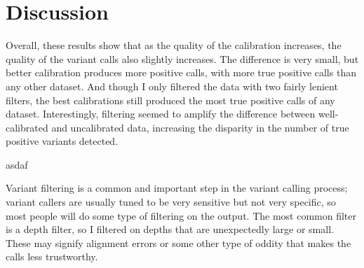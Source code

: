 \documentclass{report}
\begin{document}

\section{Discussion}
\begin{outline}
\item Overall, these results show that as the quality of the calibration increases, the quality of the variant calls also slightly increases. The difference is very small, but better calibration produces more positive calls, with more true positive calls than any other dataset. And though I only filtered the data with two fairly lenient filters, the best calibrations still produced the most true positive calls of any dataset. Interestingly, filtering seemed to amplify the difference between well-calibrated and uncalibrated data, increasing the disparity in the number of true positive variants detected.

\item asdaf


\item Variant filtering is a common and important step in the variant calling process; variant callers are usually tuned to be very sensitive but not very specific, so most people will do some type of filtering on the output. The most common filter is a depth filter, so I filtered on depths that are unexpectedly large or small. These may signify alignment errors or some other type of oddity that makes the calls less trustworthy.



\end{outline}
\end{document}

